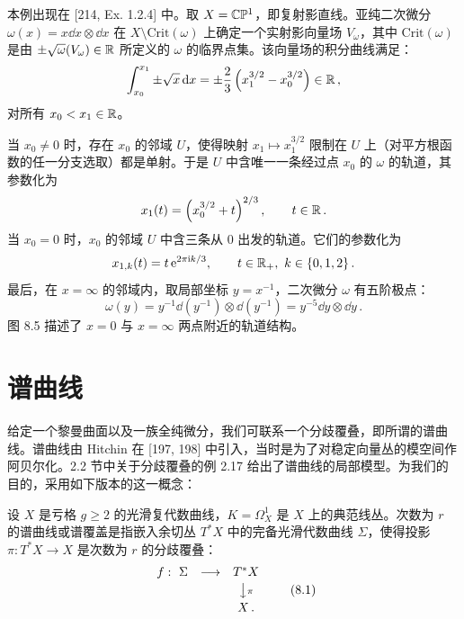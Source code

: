 
\begin{example}[8.10] 本例出现在 [214, Ex. 1.2.4] 中。取 $X=\mathbb{C}\mathbb{P}^1$，即复射影直线。亚纯二次微分 $\omega(x)=x\dd x\otimes\dd x$ 在 $X\setminus\mathrm{Crit}(\omega)$ 上确定一个实射影向量场 $V_\omega$，其中 $\mathrm{Crit}(\omega)$ 是由 $\pm\sqrt{\omega}(V_\omega)\in\mathbb{R}$ 所定义的 $\omega$ 的临界点集。该向量场的积分曲线满足：
\[
\int_{x_0}^{x_1}\pm\sqrt{x}\,\mathrm{d} x=\pm\frac{2}{3}\left(x_1^{3/2}-x_0^{3/2}\right)\in\mathbb{R}\,,
\]
对所有 $x_0<x_1\in\mathbb{R}$。\end{example}

当 $x_0\ne 0$ 时，存在 $x_0$ 的邻域 $U$，使得映射 $x_1\mapsto x_1^{3/2}$ 限制在 $U$ 上（对平方根函数的任一分支选取）都是单射。于是 $U$ 中含唯一一条经过点 $x_0$ 的 $\omega$ 的轨道，其参数化为
\[
x_1(t)=\left(x_0^{3/2}+t\right)^{2/3},\qquad t\in\mathbb{R}\,.
\]
当 $x_0=0$ 时，$x_0$ 的邻域 $U$ 中含三条从 $0$ 出发的轨道。它们的参数化为
\[
x_{1,k}(t)=t\,\ee^{2\pi\ii k/3},\qquad t\in\R_+,\ k\in\{0,1,2\}\,.
\]
最后，在 $x=\infty$ 的邻域内，取局部坐标 $y=x^{-1}$，二次微分 $\omega$ 有五阶极点：
\[
\omega(y)=y^{-1}\dd(y^{-1})\otimes\dd(y^{-1})=y^{-5}\dd y\otimes\dd y\,.
\]
图 8.5 描述了 $x=0$ 与 $x=\infty$ 两点附近的轨道结构。



\section{谱曲线}

给定一个黎曼曲面以及一族全纯微分，我们可联系一个分歧覆叠，即所谓的谱曲线。谱曲线由 Hitchin 在 [197, 198] 中引入，当时是为了对稳定向量丛的模空间作阿贝尔化。2.2 节中关于分歧覆叠的例 2.17 给出了谱曲线的局部模型。为我们的目的，采用如下版本的这一概念：

\begin{definition}[8.11] 设 $X$ 是亏格 $g\ge 2$ 的光滑复代数曲线，$K=\Omega^1_X$ 是 $X$ 上的典范线丛。次数为 $r$ 的谱曲线或谱覆盖是指嵌入余切丛 $T^*X$ 中的完备光滑代数曲线 $\Sigma$，使得投影 $\pi:T^*X\to X$ 是次数为 $r$ 的分歧覆叠：
\begin{equation}
\begin{array}{ccc}
f:\ \Sigma & \longrightarrow & T^*X\\[2pt]
 & & \big\downarrow{\scriptstyle\pi}\\[2pt]
 & & X\,.
\end{array}
\tag{8.1}
\end{equation}
\end{definition}

